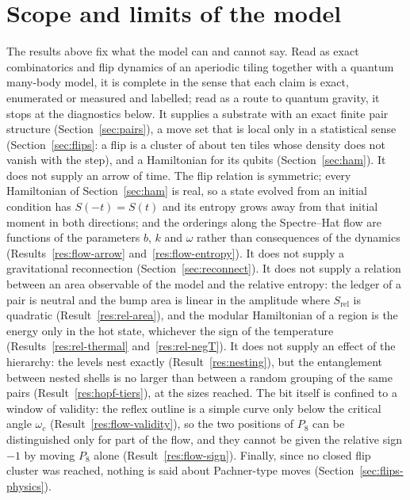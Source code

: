 \documentclass[11pt]{article}
\theoremstyle{definition}
\begin{document}
\section{Scope and limits of the model}\label{sec:limits}
The results above fix what the model can and cannot say. Read as exact combinatorics and flip dynamics of an aperiodic tiling together with a quantum many-body model, it is complete in the sense that each claim is exact, enumerated or measured and labelled; read as a route to quantum gravity, it stops at the diagnostics below. It supplies a substrate with an exact finite pair structure (Section~\ref{sec:pairs}), a move set that is local only in a statistical sense (Section~\ref{sec:flips}: a flip is a cluster of about ten tiles whose density does not vanish with the step), and a Hamiltonian for its qubits (Section~\ref{sec:ham}). It does not supply an arrow of time. The flip relation is symmetric; every Hamiltonian of Section~\ref{sec:ham} is real, so a state evolved from an initial condition has $S(-t)=S(t)$ and its entropy grows away from that initial moment in both directions; and the orderings along the Spectre--Hat flow are functions of the parameters $b$, $k$ and $\omega$ rather than consequences of the dynamics (Results~\ref{res:flow-arrow} and~\ref{res:flow-entropy}). It does not supply a gravitational reconnection (Section~\ref{sec:reconnect}). It does not supply a relation between an area observable of the model and the relative entropy: the ledger of a pair is neutral and the bump area is linear in the amplitude where $S_{\mathrm{rel}}$ is quadratic (Result~\ref{res:rel-area}), and the modular Hamiltonian of a region is the energy only in the hot state, whichever the sign of the temperature (Results~\ref{res:rel-thermal} and~\ref{res:rel-negT}). It does not supply an effect of the hierarchy: the levels nest exactly (Result~\ref{res:nesting}), but the entanglement between nested shells is no larger than between a random grouping of the same pairs (Result~\ref{res:hopf-tiers}), at the sizes reached. The bit itself is confined to a window of validity: the reflex outline is a simple curve only below the critical angle $\omega_c$ (Result~\ref{res:flow-validity}), so the two positions of $P_8$ can be distinguished only for part of the flow, and they cannot be given the relative sign $-1$ by moving $P_8$ alone (Result~\ref{res:flow-sign}). Finally, since no closed flip cluster was reached, nothing is said about Pachner-type moves (Section~\ref{sec:flips-physics}).
\end{document}
